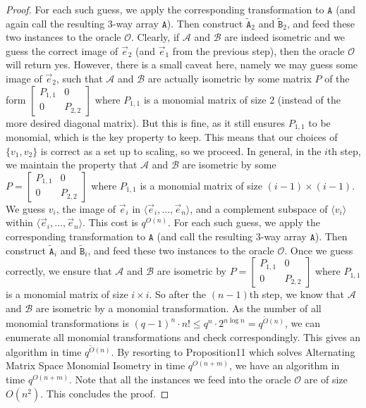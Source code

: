 \documentclass[10pt,a4paper]{article}
\begin{document}
\begin{proof}
For each such guess, we apply the corresponding transformation to $\mathtt A$ (and again call the resulting 3-way array $\mathtt A$). Then construct $\widetilde{\mathtt A}_2$ and $\widetilde{\mathtt B}_2$, and feed these two instances to the oracle $\mathcal O$. Clearly, if $\mathcal A$ and $\mathcal B$ are indeed isometric and we guess the correct image of $\vec e_2$ (and $\vec e_1$ from the previous step), then the oracle $\mathcal O$ will return yes. However, there is a small caveat here, namely we may guess some image of $\vec e_2$, such that $\mathcal A$ and $\mathcal B$ are actually isometric by some matrix $P$ of the form $\begin{bmatrix}P_{1,1}&0\\0&P_{2,2}\end{bmatrix}$ where $P_{1,1}$ is a monomial matrix of size 2 (instead of the more desired diagonal matrix). But this is fine, as it still ensures $P_{1,1}$ to be monomial, which is the key property to keep. This means that our choices of $\{v_1,v_2\}$ is correct as a set up to scaling, so we proceed.
In general, in the $i$th step, we maintain the property that $\mathcal A$ and $\mathcal B$ are isometric by some $P=\begin{bmatrix}P_{1,1}&0\\0&P_{2,2}\end{bmatrix}$ where $P_{1,1}$ is a monomial matrix of size $(i-1)\times(i-1)$. We guess $v_i$, the image of $\vec e_i$ in $\langle\vec e_i,\ldots,\vec e_n\rangle$, and a complement subspace of $\langle v_i\rangle$ within $\langle\vec e_i,\ldots,\vec e_n\rangle$. This cost is $q^{O(n)}$. For each such guess, we apply the corresponding transformation to $\mathtt A$ (and call the resulting 3-way array $\mathtt A$). Then construct $\widetilde{\mathtt A}_i$ and $\widetilde{\mathtt B}_i$, and feed these two instances to the oracle $\mathcal O$. Once we guess correctly, we ensure that $\mathcal A$ and $\mathcal B$ are isometric by $P=\begin{bmatrix}P_{1,1}&0\\0&P_{2,2}\end{bmatrix}$ where $P_{1,1}$ is a monomial matrix of size $i\times i$.
So after the $(n-1)$th step, we know that $\mathcal A$ and $\mathcal B$ are isometric by a monomial transformation. As the number of all monomial transformations is $(q-1)^n\cdot n!\le q^n\cdot2^{n\log n}=q^{\widetilde O(n)}$, we can enumerate all monomial transformations and check correspondingly. This gives an algorithm in time $q^{\widetilde O(n)}$. By resorting to Proposition11 which solves Alternating Matrix Space Monomial Isometry in time $q^{O(n+m)}$, we have an algorithm in time $q^{O(n+m)}$.
Note that all the instances we feed into the oracle $\mathcal O$ are of size $O(n^2)$. This concludes the proof.
\end{proof}
\end{document}
